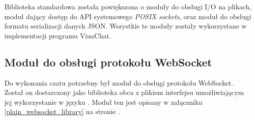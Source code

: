 Biblioteka standardowa została powiększona o moduły do obsługi I/O na plikach,
moduł dający dostęp do API systemowego \emph{POSIX sockets}, oraz moduł do
obsługi formatu serializacji danych JSON.
Wszystkie te moduły zostały wykorzystane w implementacji programu ViuaChat.

\subsection{Moduł do obsługi protokołu WebSocket}

Do wykonania czatu potrzebny był moduł do obsługi protokołu WebSocket.
Został on dostarczony jako biblioteka obca z plikiem interfejsu umożliwiającym
jej wykorzystanie w języku \ViuAct. Moduł ten jest opisany w załączniku
\ref{plain_websocket_library} na stronie \pageref{plain_websocket_library}.
